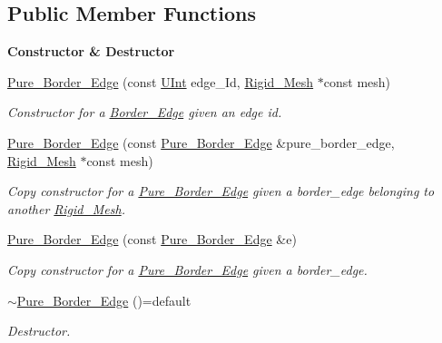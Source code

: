 \subsection*{Public Member Functions}
\begin{Indent}{\bf Constructor \& Destructor}\par
\begin{DoxyCompactItemize}
\item 
\hyperlink{classFVCode3D_1_1Rigid__Mesh_1_1Pure__Border__Edge_a2fb097d2d34f9f6291001e9b7f300e37}{Pure\+\_\+\+Border\+\_\+\+Edge} (const \hyperlink{namespaceFVCode3D_a4bf7e328c75d0fd504050d040ebe9eda}{U\+Int} edge\+\_\+\+Id, \hyperlink{classFVCode3D_1_1Rigid__Mesh}{Rigid\+\_\+\+Mesh} $\ast$const mesh)
\begin{DoxyCompactList}\small\item\em Constructor for a \hyperlink{classFVCode3D_1_1Rigid__Mesh_1_1Border__Edge}{Border\+\_\+\+Edge} given an edge id. \end{DoxyCompactList}\item 
\hyperlink{classFVCode3D_1_1Rigid__Mesh_1_1Pure__Border__Edge_a1c6e43be820f240b386b0e45420a1a37}{Pure\+\_\+\+Border\+\_\+\+Edge} (const \hyperlink{classFVCode3D_1_1Rigid__Mesh_1_1Pure__Border__Edge}{Pure\+\_\+\+Border\+\_\+\+Edge} \&pure\+\_\+border\+\_\+edge, \hyperlink{classFVCode3D_1_1Rigid__Mesh}{Rigid\+\_\+\+Mesh} $\ast$const mesh)
\begin{DoxyCompactList}\small\item\em Copy constructor for a \hyperlink{classFVCode3D_1_1Rigid__Mesh_1_1Pure__Border__Edge}{Pure\+\_\+\+Border\+\_\+\+Edge} given a border\+\_\+edge belonging to another \hyperlink{classFVCode3D_1_1Rigid__Mesh}{Rigid\+\_\+\+Mesh}. \end{DoxyCompactList}\item 
\hyperlink{classFVCode3D_1_1Rigid__Mesh_1_1Pure__Border__Edge_aae95df1938a302a415ba7a0bbd7e83f4}{Pure\+\_\+\+Border\+\_\+\+Edge} (const \hyperlink{classFVCode3D_1_1Rigid__Mesh_1_1Pure__Border__Edge}{Pure\+\_\+\+Border\+\_\+\+Edge} \&e)
\begin{DoxyCompactList}\small\item\em Copy constructor for a \hyperlink{classFVCode3D_1_1Rigid__Mesh_1_1Pure__Border__Edge}{Pure\+\_\+\+Border\+\_\+\+Edge} given a border\+\_\+edge. \end{DoxyCompactList}\item 
\hyperlink{classFVCode3D_1_1Rigid__Mesh_1_1Pure__Border__Edge_a3b6ec63c74962f25e82bf0dbeffef598}{$\sim$\+Pure\+\_\+\+Border\+\_\+\+Edge} ()=default
\begin{DoxyCompactList}\small\item\em Destructor. \end{DoxyCompactList}\end{DoxyCompactItemize}
\end{Indent}
